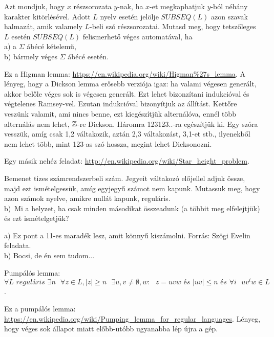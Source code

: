 \begin{Exercise}[counter={sorszam}, difficulty=2]
	Azt mondjuk, hogy $x$ r\'eszsorozata $y$-nak, ha $x$-et megkaphatjuk $y$-b\'ol n\'eh\'any karakter kit\"orl\'es\'evel. Adott $L$ nyelv eset\'en jel\"olje $SUBSEQ(L)$ azon szavak halmaz\'at, amik valamely $L$-beli sz\'o r\'eszsorozatai. Mutasd meg, hogy tetsz\H oleges $L$ eset\'en $SUBSEQ(L)$ felismerhet\H o v\'eges automat\'aval, ha\\
	a) a $\Sigma$ ábécé k\'etelem\H u,\\
	b) b\'armely v\'eges $\Sigma$ ábécé eset\'en.
\end{Exercise}
\begin{Answer}
	Ez a Higman lemma: \url{https://en.wikipedia.org/wiki/Higman%27s_lemma}.
		A l\'enyeg, hogy a Dickson lemma er\H osebb verzi\'oja igaz: ha valami v\'egesen gener\'alt, akkor bel\H ole v\'eges sok is v\'egesen gener\'alt. Ezt lehet bizonz\'itani indukci\'oval \'es v\'egtelenes Ramsey-vel. Ezutan indukci\'oval bizony\'itjuk az \'all\'it\'ast. Kett\H ore vesz\"unk valamit, ami nincs benne, ezt kieg\'esz\'itj\"uk altern\'al\'ova, enn\'el t\"obb altern\'al\'as nem lehet, $\mathbb{Z}$-re Dickson. H\'aromra 123123..-ra eg\'esz\'itj\"uk ki. Egy sz\'ora vessz\"uk, am\'ig csak 1,2 v\'altakozik, azt\'an 2,3 v\'altakoz\'ast, 3,1-et stb., ilyenekb\H ol nem lehet t\"obb, mint 123-as sz\'o hossza, megint lehet Dicksonozni.
		
		Egy m\'asik neh\'ez feladat: \url{http://en.wikipedia.org/wiki/Star_height_problem}.	
	\end{Answer}
	
	
	\begin{Exercise}[counter={sorszam}, difficulty=0]
		Bemenet tizes sz\'amrendszerbeli sz\'am. Jegyeit v\'altakoz\'o el\H ojellel adjuk \"ossze, majd ezt ism\'etelgess\"uk, am\'ig egyjegy\H u sz\'amot nem kapunk. Mutassuk meg, hogy azon sz\'amok nyelve, amikre null\'at kapunk, regul\'aris.\\
		b)~\veryhard Mi a helyzet, ha csak minden m\'asodikat \"osszeadunk (a t\"obbit meg elfelejtj\"uk) \'es ezt ism\'etelgetj\"uk?
	\end{Exercise}
	\begin{Answer}
		a) Ez pont a 11-es marad\'ek lesz, amit k\"onny\H u kisz\'amolni.
		Forr\'as: Sz\"ogi Evelin feladata.\\
		b) Bocsi, de \'en sem tudom...
	\end{Answer}
	
	\begin{Exercise}[counter={sorszam}, difficulty=0]
		Pumpálós lemma: $\forall L \textit{ reguláris } \exists n \textit{ } \forall z\in L, |z|\geq n \textit{ }\exists u,v\ne \emptyset,w:\textit{ } z=uvw \textit{ és } |uv|\leq n \textit{ és } \forall i\textit{ } uv^iw\in L$.
	\end{Exercise}
	\begin{Answer}
		Ez a pump\'al\'os lemma: \url{https://en.wikipedia.org/wiki/Pumping_lemma_for_regular_languages}.
		L\'enyeg, hogy v\'eges sok \'allapot miatt el\H obb-ut\'obb ugyanabba l\'ep \'ujra a g\'ep.
	\end{Answer}
	
